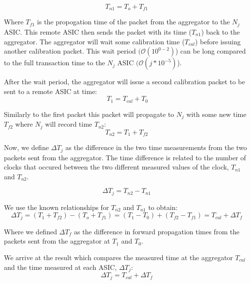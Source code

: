 \begin{equation}
  T_{n1} = T_{o} + T_{f1}
\end{equation}


Where $T_{f1}$ is the propogation time of the packet from the aggregator to the $N_{j}$ ASIC.
This remote ASIC then sends the packet with its time ($T_{n1}$) back to the aggregator.
The aggregator will wait some calibration time ($T_{cal}$) before issuing another calibration packet.
This wait period $(\mathcal{O}(10^{0-2})$) can be long compared to the full transaction time to the $N_{j}$ ASIC $(\mathcal{O}(j*10^{-5})$).

After the wait period, the aggregator will issue a second calibration packet to be sent to a remote ASIC at time:
\begin{equation}~\label{eq:calibration_wait_time}
  T_{1} = T_{cal} + T_{0}
\end{equation}

Similarly to the first packet this packet will propagate to $N_{j}$ with some new time $T_{f2}$ where $N_{j}$ will record time $T_{n2}$:
\begin{equation}
  T_{n2} = T_{1} + T_{f2}
\end{equation}

Now, we define $\Delta T_{j}$ as the difference in the two time measurements from the two packets sent from the aggregator.
The time difference is related to the number of clocks that occured between the two different measured values of the clock, $T_{n1}$ and $T_{n2}$.

\begin{equation}
  \Delta T_{j} = T_{n2} - T_{n1}
\end{equation}

We use the known relationships for $T_{n2}$ and $T_{n1}$ to obtain:
\begin{equation}
  \Delta T_{j} = (T_{1} + T_{f2}) - (T_{o} + T_{f1}) = (T_{1} - T_{0}) + (T_{f2} - T_{f1}) = T_{cal} + \Delta T_{f}
\end{equation}

Where we defined $\Delta T_{f}$ as the difference in forward propagation times from the packets sent from the aggregator at $T_{1}$ and $T_{0}$.

We arrive at the result which compares the measured time at the aggregator $T_{cal}$ and the time measured at each ASIC, $\Delta T_{j}$:
\begin{equation}
  \Delta T_{j} = T_{cal} + \Delta T_{f}
\end{equation}

